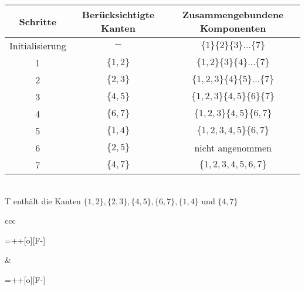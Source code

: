 \documentclass[a4paper]{scrartcl}
\begin{document}
\begin{tabular}{ccc}
	Schritte	&	Berücksichtigte Kanten	&	Zusammengebundene Komponenten	\\
	\hline
	Initialisierung			&	$-$												&	$\{1\} \{2\} \{3\} \dots \{7\}$ \\
	1										&	$\{1,2\}$									&	$\{1,2\} \{3\} \{4\} \dots \{7\}$ \\
	2										& $\{2,3\}$									&	$\{1,2,3\} \{4\} \{5\} \dots \{7\}$ \\
	3										&	$\{4,5\}$									&	$\{1,2,3\} \{4,5\} \{6\} \{7\}$ \\
	4										&	$\{6,7\}$									&	$\{1,2,3\} \{4,5\} \{6,7\}$ \\
	5										& $\{1,4\}$									&	$\{1,2,3,4,5\} \{6,7\}$ \\
	6										&	$\{2,5\}$									&	nicht angenommen \\
	7										&	$\{4,7\}$									&	$\{1,2,3,4,5,6,7\}$ \\
\end{tabular} \\
	
T enthält die Kanten $\{1,2\},\{2,3\},\{4,5\},\{6,7\},\{1,4\}$ und $\{4,7\}$ \\

\begin{tabular}[t]{ccc}
    \begin{xy}
        \entrymodifiers={++[o][F-]}
    \end{xy} &        
    \begin{xy}
        \entrymodifiers={++[o][F-]}
    \end{xy} \\
	\end{tabular}
\end{document}
